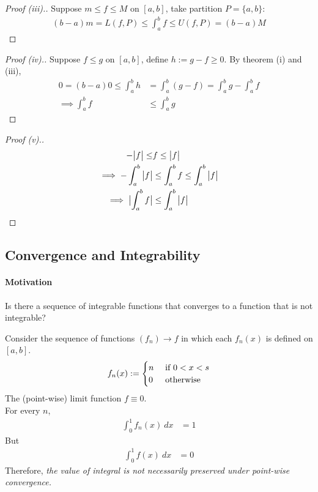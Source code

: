 \documentclass[11pt]{article}
\begin{document}
	\begin{proof}[Proof (iii).]
		Suppose $m \leq f \leq M$ on $[a, b]$, take partition $P=\{a, b\}$:
		\begin{align}
			(b-a)m = L(f, P) \leq \int_a^b f \leq U(f, P) = (b-a)M
		\end{align}
	\end{proof}
	
	\begin{proof}[Proof (iv).]
		Suppose $f \leq g$ on $[a, b]$, define $h := g - f \geq 0$. By theorem (i) and (iii), 
		\begin{align}
			0 = (b-a) 0 \leq \int_a^b h &= \int_a^b (g - f) = \int_a^b g - \int_a^b f \\
			\implies \int_a^b f &\leq \int_a^b g
		\end{align}
	\end{proof}
	
	\begin{proof}[Proof (v).]
		\begin{align}
			-\big \vert {f} \big \vert \leq &f \leq \big \vert {f} \big \vert \\
			\implies - \int_a^b \big \vert {f} \big \vert &\leq \int_a^b f \leq \int_a^b \big \vert {f} \big \vert \\
			\implies \big \vert {\int_a^b f} \big \vert &\leq \int_a^b \big \vert {f} \big \vert
		\end{align}
	\end{proof}
	
	\subsection{Convergence and Integrability}
	\paragraph{Motivation} Is there a sequence of integrable functions that converges to a function that is not integrable?
	
	\begin{example}
		Consider the sequence of functions $(f_n) \to f$ in which each $f_n(x)$ is defined on $[a, b]$.
		\begin{align}
			f_n(x) := \begin{cases}
				n &\text{{ if }} 0 < x < s \\
				0 &\text{{ otherwise}}
			\end{cases}
		\end{align}
		The (point-wise) limit function $f \equiv 0$. \\
		For every $n$,
		\begin{align}
			\int_0^1 f_n(x)\ dx &= 1
		\end{align}
		But 
		\begin{align}
			\int_0^1 f(x)\ dx &= 0
		\end{align}
		Therefore, \emph{the value of integral is not necessarily preserved under point-wise convergence.}
	\end{example}
\end{document}
